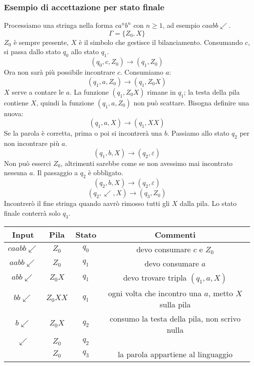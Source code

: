 \documentclass[11pt]{article}
\begin{document}
\subsubsection{Esempio di accettazione per stato finale}
Processiamo una stringa nella forma $ca^nb^n$ con $n\geq 1$, ad esempio $caabb\swarrow$. 
\begin{equation*}
    \Gamma=\{Z_0,X\}
\end{equation*}
$Z_0$ è sempre presente, $X$ è il simbolo che gestisce il bilanciamento. Consumando $c$, si passa dallo stato $q_0$ allo 
stato $q_1$.
\begin{equation*}
    (q_0,c,Z_0)\rightarrow(q_1,Z_0)
\end{equation*}
Ora non sarà più possibile incontrare $c$. Consumiamo $a$:
\begin{equation*}
    (q_1,a,Z_0)\rightarrow(q_1,Z_0X)
\end{equation*}
$X$ serve a contare le $a$. La funzione $(q_1,Z_0X)$ rimane in $q_1$; la testa della pila contiene $X$, quindi la funzione
$(q_1,a,Z_0)$ non può scattare. Bisogna definire una nuova:
\begin{equation*}
    (q_1,a,X)\rightarrow(q_1,XX)
\end{equation*}
Se la parola è corretta, prima o poi si incontrerà una $b$. Passiamo allo stato $q_2$ per non incontrare più $a$.
\begin{equation*}
    (q_1,b,X)\rightarrow(q_2,\varepsilon)
\end{equation*}
Non può esserci $Z_0$, altrimenti sarebbe come se non avessimo mai incontrato nessuna $a$. Il passaggio a $q_2$ è obbligato.
\begin{equation*}
    (q_2,b,X)\rightarrow(q_2,\varepsilon)
\end{equation*}
\begin{equation*}
    (q_2,\swarrow,X)\rightarrow(q_3,Z_0)
\end{equation*}
Incontrerò il fine stringa quando aavrò rimosso tutti gli $X$ dalla pila. Lo stato finale conterrà solo $q_3$.
\begin{center}
    \begin{tabular}{ |c|c|c|c| }
     \hline
     Input & Pila & Stato & Commenti \\ 
     \hline\hline
     $caabb\swarrow$ & $Z_0$ & $q_0$ & devo consumare $c$ e $Z_0$ \\ 
     $aabb\swarrow$ & $Z_0$ & $q_1$ & devo consumare $a$ \\ 
     $abb\swarrow$ & $Z_0X$ & $q_1$ & devo trovare tripla $(q_1,a,X)$ \\ 
     $bb\swarrow$ & $Z_0XX$ & $q_1$ & ogni volta che incontro una $a$, metto $X$ sulla pila \\ 
     $b\swarrow$ & $Z_0X$ & $q_2$ & consumo la testa della pila, non scrivo nulla \\ 
     $\swarrow$ & $Z_0$ & $q_2$ & \\ 
     $ $ & $Z_0$ & $q_3$ & la parola appartiene al linguaggio \\ 
     \hline
    \end{tabular}
\end{center}
\end{document}
